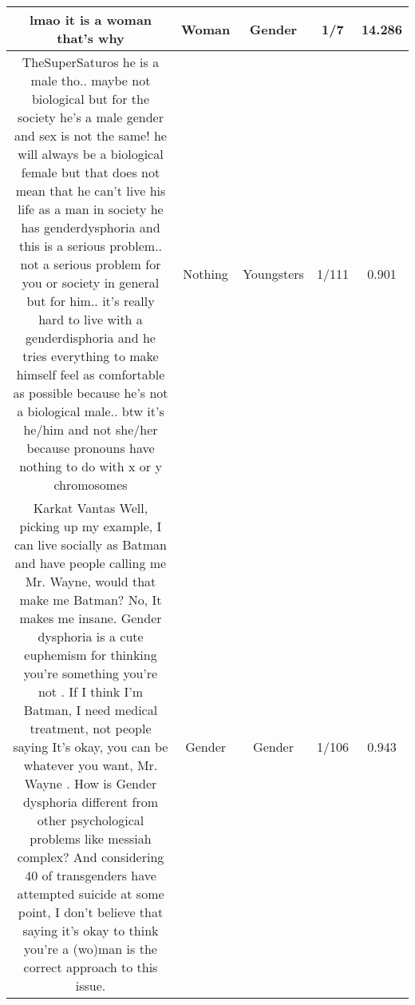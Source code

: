\documentclass[11pt]{article}
\newlength\mylength
\begin{document}
\begin{center}
\begin{longtable}{|C{.40\mylength}|C{.30\mylength}|C{.15\mylength}|C{.15\mylength}|C{.15\mylength}|}
  lmao it is a woman that's why  & Woman & Gender & 1/7 & 14.286 \\  \hline
  TheSuperSaturos he is a male tho.. maybe not biological but for the society he's a male  gender and sex is not the same! he will always be a biological female but that does not mean that he can't live his life as a man in society he has genderdysphoria and this is a serious problem.. not a serious problem for you or society in general but for him.. it's really hard to live with a genderdisphoria and he tries everything to make himself feel as comfortable as possible because he's not a biological male.. btw it's he/him and not she/her because pronouns have nothing to do with x or y chromosomes  & Nothing & Youngsters & 1/111 & 0.901 \\  \hline
  Karkat Vantas Well, picking up my example, I can live socially as Batman and have people calling me Mr. Wayne, would that make me Batman? No, It makes me insane. Gender dysphoria is a cute euphemism for  thinking you're something you're not . If I think I'm Batman, I need medical treatment, not people saying  It's okay, you can be whatever you want, Mr. Wayne . How is Gender dysphoria different from other psychological problems like messiah complex? And considering 40  of transgenders have attempted suicide at some point, I don't believe that saying it's okay to think you're a (wo)man is the correct approach to this issue.  & Gender & Gender & 1/106 & 0.943 \\  \hline

\end{longtable}
\end{center}
\end{document}
